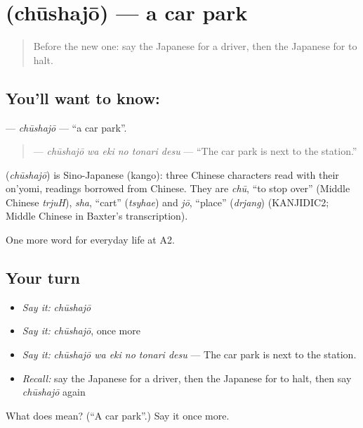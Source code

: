 \section[\texorpdfstring{\ja{ちゅうしゃじょう} (chūshajō)}{ちゅうしゃじょう (chūshajō)}]{ (chūshajō) — a car park}

\label{lesson:JA-C202-chuushajou}



\begin{quote}
Before the new one: say the Japanese for a driver, then the Japanese for to halt.
\end{quote}

\subsection*{You'll want to know: }
\textbf{} — \emph{chūshajō} — \textquotedblleft{}a car park\textquotedblright{}.

\begin{quote}
\textbf{  } — \emph{chūshajō wa eki no tonari desu} — \textquotedblleft{}The car park is next to the station.\textquotedblright{}
\end{quote}

\begin{cousinweb}
\textbf{} (\emph{chūshajō}) is Sino-Japanese (kango): three Chinese characters read with their on'yomi, readings borrowed from Chinese. They are \emph{chū}, \textquotedblleft{}to stop over\textquotedblright{} (Middle Chinese \emph{trjuH}), \emph{sha}, \textquotedblleft{}cart\textquotedblright{} (\emph{tsyhae}) and \emph{jō}, \textquotedblleft{}place\textquotedblright{} (\emph{drjang}) (KANJIDIC2; Middle Chinese in Baxter's transcription).
\end{cousinweb}

\begin{grammarlens}[title={What you've built}]
One more word for everyday life at A2.
\end{grammarlens}

\subsection*{Your turn}
\begin{itemize}
\raggedright
  \item \emph{Say it:} \emph{chūshajō}
  \item \emph{Say it:} \emph{chūshajō}, once more
  \item \emph{Say it:} \emph{chūshajō wa eki no tonari desu} — The car park is next to the station.
  \item \emph{Recall:} say the Japanese for a driver, then the Japanese for to halt, then say \emph{chūshajō} again
\end{itemize}

\begin{tcolorbox}[breakable,colback=teal!4,colframe=teal!35!black,title={Before you move on}]
What does  mean? (\textquotedblleft{}A car park\textquotedblright{}.) Say it once more.
\end{tcolorbox}
